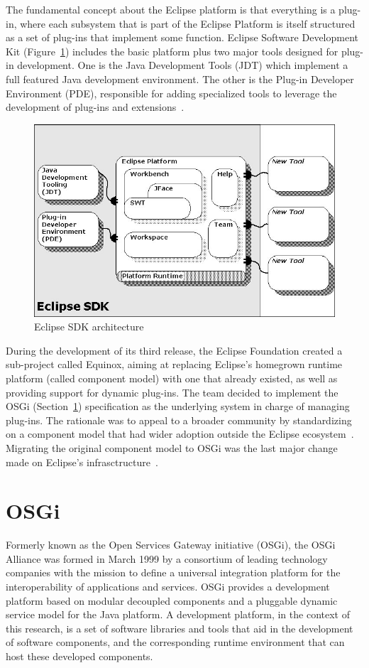 The fundamental concept about the Eclipse platform is that everything is a
plug-in, where each subsystem that is part of the Eclipse Platform is itself
structured as a set of plug-ins that implement some function. Eclipse Software
Development Kit (Figure~\ref{fig:eclipsesdk}) includes the basic platform plus
two major tools designed for plug-in development. One is the Java Development
Tools (JDT) which implement a full featured Java development environment. The
other is the Plug-in Developer Environment (PDE), responsible for adding
specialized tools to leverage the development of plug-ins and
extensions~\cite{brownwilson2011archoss, eclipse2014architecture,
danjou2005java}.

\begin{figure}[h!]
\centering
\includegraphics[width=.5\textwidth]{figures/sdk-arch}
\caption{Eclipse SDK architecture}
\label{fig:eclipsesdk}
\end{figure}

During the development of its third release, the Eclipse Foundation created a
sub-project called Equinox, aiming at replacing Eclipse's homegrown runtime platform
(called component model) with one that already existed, as well as
providing support for dynamic plug-ins. The team decided to implement the OSGi
(Section~\ref{sec:osgi}) specification as the underlying system in charge of
managing plug-ins. The rationale was to appeal to a broader community by
standardizing on a component model that had wider adoption outside the Eclipse
ecosystem~\cite{brownwilson2011archoss}. Migrating the original component model
to OSGi was the last major change made on Eclipse's
infrasctructure~\cite{blewitt2013eclipse}.

\section{OSGi}\label{sec:osgi}

Formerly known as the Open Services Gateway initiative (OSGi), the OSGi Alliance
was formed in March 1999 by a consortium of leading technology companies with
the mission to define a universal integration platform for the interoperability
of applications and services. OSGi provides a development platform based on
modular decoupled components and a pluggable dynamic service model for the Java
platform. A development platform, in the context of this research, is a set of
software libraries and tools that aid in the development of software components,
and the corresponding runtime environment that can host these developed
components.

